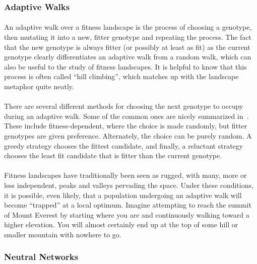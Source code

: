 \documentclass[12pt,letterpaper,titlepage,draft]{article}
\begin{document}
\subsubsection{Adaptive Walks}

\paragraph{}
An adaptive walk over a fitness landscape is the process of choosing a
genotype, then mutating it into a new, fitter genotype and repeating the
process. The fact that the new genotype is always fitter (or possibly at least
as fit) as the current genotype clearly differentiates an adaptive walk from a
random walk, which can also be useful to the study of fitness landscapes. It is
helpful to know that this process is often called ``hill climbing'', which
matches up with the landscape metaphor quite neatly.

\paragraph{}
There are several different methods for choosing the next genotype to occupy
during an adaptive walk. Some of the common ones are nicely summarized
in~\cite{Nowak2015}. These include fitness-dependent, where the choice is made
randomly, but fitter genotypes are given preference. Alternately, the choice
can be purely random. A greedy strategy chooses the fittest candidate, and
finally, a reluctant strategy chooses the least fit candidate that is fitter
than the current genotype.

\paragraph{}
Fitness landscapes have traditionally been seen as rugged, with many, more or
less independent, peaks and valleys pervading the space. Under these
conditions, it is possible, even likely, that a population undergoing an
adaptive walk will become ``trapped'' at a local optimum. Imagine attempting to
reach the summit of Mount Everest by starting where you are and continuously
walking toward a higher elevation. You will almost certainly end up at the top
of some hill or smaller mountain with nowhere to go.

\subsubsection{Neutral Networks}
\end{document}
